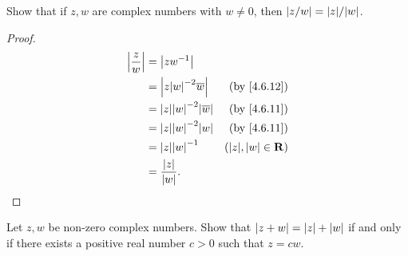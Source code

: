 \begin{exercise}\label{ex 4.6.7}
  Show that if \(z, w\) are complex numbers with \(w \neq 0\), then \(\abs{z / w} = \abs{z} / \abs{w}\).
\end{exercise}

\begin{proof}
  \begin{align*}
    \abs{\frac{z}{w}} & = \abs{z w^{-1}}                                                      \\
                      & = \abs{z \abs{w}^{-2} \overline{w}}       & \text{(by \cref{4.6.12})} \\
                      & = \abs{z} \abs{w}^{-2} \abs{\overline{w}} & \text{(by \cref{4.6.11})} \\
                      & = \abs{z} \abs{w}^{-2} \abs{w}            & \text{(by \cref{4.6.11})} \\
                      & = \abs{z} \abs{w}^{-1}                    & (\abs{z}, \abs{w} \in \R) \\
                      & = \frac{\abs{z}}{\abs{w}}.
  \end{align*}
\end{proof}

\begin{exercise}\label{ex 4.6.8}
  Let \(z, w\) be non-zero complex numbers.
  Show that \(\left\lvert z + w\right\rvert = \left\lvert z\right\rvert + \left\lvert w\right\rvert\) if and only if there exists a positive real number \(c > 0\) such that \(z = cw\).
\end{exercise}

